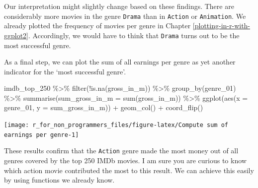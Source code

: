 \documentclass[
]{book}
\newenvironment{Shaded}{\begin{snugshade}}{\end{snugshade}}
\newcommand{\AttributeTok}[1]{\textcolor[rgb]{0.77,0.63,0.00}{#1}}
\newcommand{\FunctionTok}[1]{\textcolor[rgb]{0.00,0.00,0.00}{#1}}
\newcommand{\NormalTok}[1]{#1}
\newcommand{\SpecialCharTok}[1]{\textcolor[rgb]{0.00,0.00,0.00}{#1}}
\begin{document}
Our interpretation might slightly change based on these findings. There are considerably more movies in the genre \texttt{Drama} than in \texttt{Action} or \texttt{Animation}. We already plotted the frequency of movies per genre in Chapter \ref{plotting-in-r-with-ggplot2}. Accordingly, we would have to think that \texttt{Drama} turns out to be the most successful genre.

As a final step, we can plot the sum of all earnings per genre as yet another indicator for the `most successful genre'.

\begin{Shaded}
\begin{Highlighting}[]
\NormalTok{imdb\_top\_250 }\SpecialCharTok{\%\textgreater{}\%}
  \FunctionTok{filter}\NormalTok{(}\SpecialCharTok{!}\FunctionTok{is.na}\NormalTok{(gross\_in\_m)) }\SpecialCharTok{\%\textgreater{}\%} 
  \FunctionTok{group\_by}\NormalTok{(genre\_01) }\SpecialCharTok{\%\textgreater{}\%} 
  \FunctionTok{summarise}\NormalTok{(}\AttributeTok{sum\_gross\_in\_m =} \FunctionTok{sum}\NormalTok{(gross\_in\_m)) }\SpecialCharTok{\%\textgreater{}\%} 
  \FunctionTok{ggplot}\NormalTok{(}\FunctionTok{aes}\NormalTok{(}\AttributeTok{x =}\NormalTok{ genre\_01, }\AttributeTok{y =}\NormalTok{ sum\_gross\_in\_m)) }\SpecialCharTok{+}
  \FunctionTok{geom\_col}\NormalTok{() }\SpecialCharTok{+}
  \FunctionTok{coord\_flip}\NormalTok{()}
\end{Highlighting}
\end{Shaded}

\begin{center}\texttt{[image: r\_for\_non\_programmers\_files/figure-latex/Compute sum of earnings per genre-1]} \end{center}

These results confirm that the \texttt{Action} genre made the most money out of all genres covered by the top 250 IMDb movies. I am sure you are curious to know which action movie contributed the most to this result. We can achieve this easily by using functions we already know.
\end{document}

